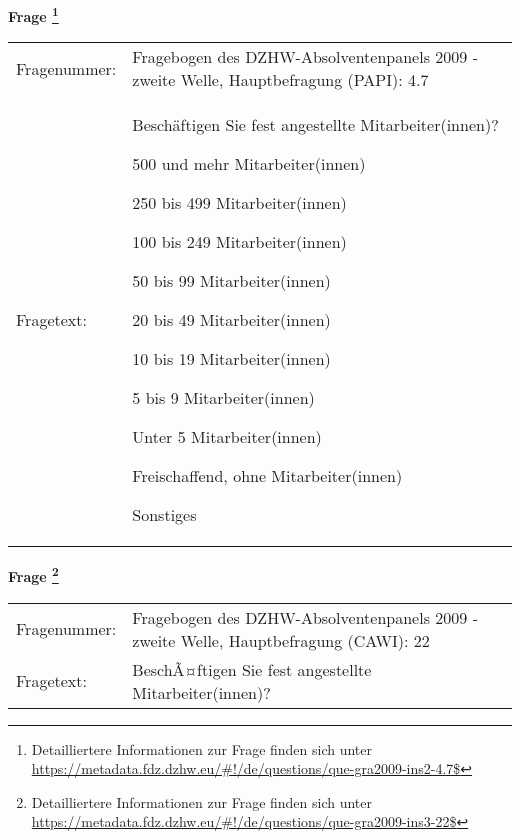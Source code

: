 				\vspace*{0.5cm}
                \noindent\textbf{Frage
	                \footnote{Detailliertere Informationen zur Frage finden sich unter
		              \url{https://metadata.fdz.dzhw.eu/\#!/de/questions/que-gra2009-ins2-4.7$}}}\\
				\begin{tabularx}{\hsize}{@{}lX}
					Fragenummer: &
					  Fragebogen des DZHW-Absolventenpanels 2009 - zweite Welle, Hauptbefragung (PAPI):
					  4.7
 \\
					Fragetext: & Beschäftigen Sie fest angestellte Mitarbeiter(innen)?\par  500 und mehr Mitarbeiter(innen)\par  250 bis 499 Mitarbeiter(innen)\par  100 bis 249 Mitarbeiter(innen)\par  50 bis 99 Mitarbeiter(innen)\par  20 bis 49 Mitarbeiter(innen)\par  10 bis 19 Mitarbeiter(innen)\par  5 bis 9 Mitarbeiter(innen)\par  Unter 5 Mitarbeiter(innen)\par  Freischaffend, ohne Mitarbeiter(innen)\par  Sonstiges \\
				\end{tabularx}
				\vspace*{0.5cm}
                \noindent\textbf{Frage
	                \footnote{Detailliertere Informationen zur Frage finden sich unter
		              \url{https://metadata.fdz.dzhw.eu/\#!/de/questions/que-gra2009-ins3-22$}}}\\
				\begin{tabularx}{\hsize}{@{}lX}
					Fragenummer: &
					  Fragebogen des DZHW-Absolventenpanels 2009 - zweite Welle, Hauptbefragung (CAWI):
					  22
 \\
					Fragetext: & BeschÃ¤ftigen Sie fest angestellte Mitarbeiter(innen)? \\
				\end{tabularx}





